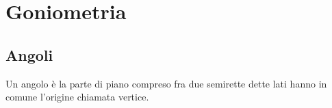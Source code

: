 \chapter{Goniometria}
\label{sec:GONIOMETRIA}
\minitoc
\mtcskip                                %
\minilof                                %
\mtcskip                                %
\minilot
\section{Angoli}
\label{sec:gonioang}
\begin{definizione}[Angolo]
Un angolo è la parte di piano compreso fra due semirette dette lati hanno in comune l'origine chiamata vertice.
\end{definizione}

